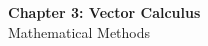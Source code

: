 \documentclass[12pt]{article}
\begin{document}
\begin{center}
  {\LARGE\bfseries Chapter 3: Vector Calculus}\\[0.25em]
  {\large Mathematical Methods}\\[0.15em]
\end{center}

\end{document}
